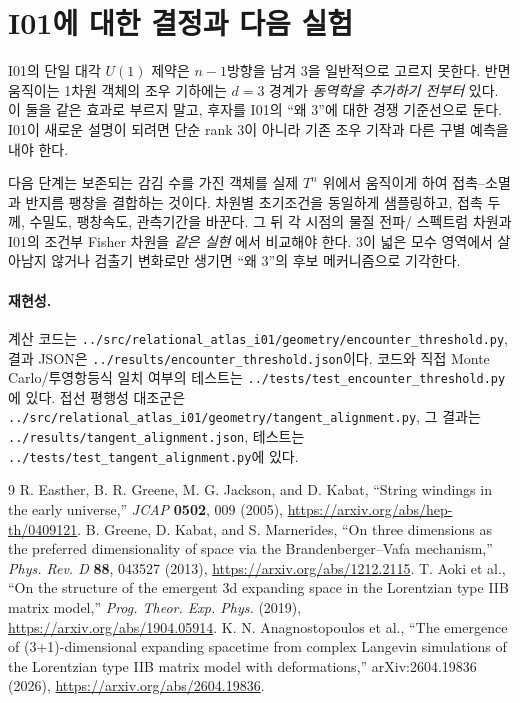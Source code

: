 \documentclass[11pt,a4paper]{article}
\begin{document}
\section{I01에 대한 결정과 다음 실험}
I01의 단일 대각 $U(1)$ 제약은 $n-1$방향을 남겨 3을 일반적으로
고르지 못한다. 반면 움직이는 1차원 객체의 조우 기하에는
$d=3$ 경계가 \emph{동역학을 추가하기 전부터} 있다.
이 둘을 같은 효과로 부르지 말고, 후자를 I01의 ``왜 3''에 대한
경쟁 기준선으로 둔다. I01이 새로운 설명이 되려면 단순 rank 3이
아니라 기존 조우 기작과 다른 구별 예측을 내야 한다.

다음 단계는 보존되는 감김 수를 가진 객체를 실제 $T^n$ 위에서
움직이게 하여 접촉--소멸과 반지름 팽창을 결합하는 것이다.
차원별 초기조건을 동일하게 샘플링하고, 접촉 두께, 수밀도,
팽창속도, 관측기간을 바꾼다. 그 뒤 각 시점의 물질 전파/
스펙트럼 차원과 I01의 조건부 Fisher 차원을 \emph{같은 실현}
에서 비교해야 한다. 3이 넓은 모수 영역에서 살아남지 않거나
검출기 변화로만 생기면 ``왜 3''의 후보 메커니즘으로 기각한다.

\paragraph{재현성.} 계산 코드는 \texttt{../src/relational\_atlas\_i01/geometry/encounter\_threshold.py},
결과 JSON은 \texttt{../results/encounter\_threshold.json}이다.
코드와 직접 Monte Carlo/투영항등식 일치 여부의 테스트는
\texttt{../tests/test\_encounter\_threshold.py}에 있다.
접선 평행성 대조군은 \texttt{../src/relational\_atlas\_i01/geometry/tangent\_alignment.py},
그 결과는 \texttt{../results/tangent\_alignment.json},
테스트는 \texttt{../tests/test\_tangent\_alignment.py}에 있다.

\begin{thebibliography}{9}
 R. Easther, B. R. Greene, M. G. Jackson,
and D. Kabat, ``String windings in the early universe,''
\emph{JCAP} \textbf{0502}, 009 (2005),
\url{https://arxiv.org/abs/hep-th/0409121}.
 B. Greene, D. Kabat, and S. Marnerides,
``On three dimensions as the preferred dimensionality of space via
the Brandenberger--Vafa mechanism,'' \emph{Phys. Rev. D} \textbf{88},
043527 (2013), \url{https://arxiv.org/abs/1212.2115}.
 T. Aoki et al., ``On the structure of the emergent
3d expanding space in the Lorentzian type IIB matrix model,''
\emph{Prog. Theor. Exp. Phys.} (2019),
\url{https://arxiv.org/abs/1904.05914}.
 K. N. Anagnostopoulos et al.,
``The emergence of (3+1)-dimensional expanding spacetime from complex
Langevin simulations of the Lorentzian type IIB matrix model with
deformations,'' arXiv:2604.19836 (2026),
\url{https://arxiv.org/abs/2604.19836}.
\end{thebibliography}
\end{document}
